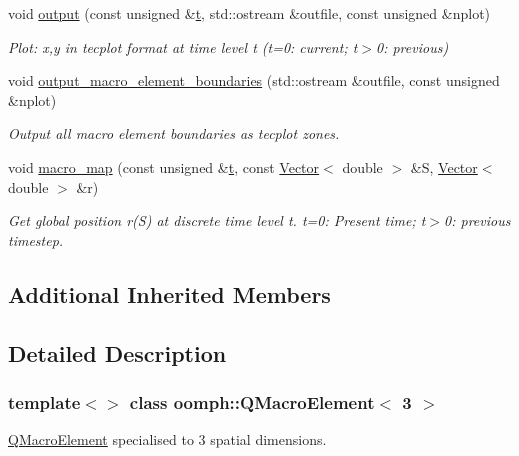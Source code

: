 \begin{DoxyCompactItemize}
void \hyperlink{classoomph_1_1QMacroElement_3_013_01_4_a5c1916d58b2d3142b5fa85f209e16b4c}{output} (const unsigned \&\hyperlink{cfortran_8h_af6f0bd3dc13317f895c91323c25c2b8f}{t}, std\+::ostream \&outfile, const unsigned \&nplot)
\begin{DoxyCompactList}\small\item\em Plot\+: x,y in tecplot format at time level t (t=0\+: current; t$>$0\+: previous) \end{DoxyCompactList}\item 
void \hyperlink{classoomph_1_1QMacroElement_3_013_01_4_aeb5d117bf346d710bd4f8fc4f04dbfd5}{output\+\_\+macro\+\_\+element\+\_\+boundaries} (std\+::ostream \&outfile, const unsigned \&nplot)
\begin{DoxyCompactList}\small\item\em Output all macro element boundaries as tecplot zones. \end{DoxyCompactList}\item 
void \hyperlink{classoomph_1_1QMacroElement_3_013_01_4_ae99513e135616e45927307ccfa0f8306}{macro\+\_\+map} (const unsigned \&\hyperlink{cfortran_8h_af6f0bd3dc13317f895c91323c25c2b8f}{t}, const \hyperlink{classoomph_1_1Vector}{Vector}$<$ double $>$ \&S, \hyperlink{classoomph_1_1Vector}{Vector}$<$ double $>$ \&r)
\begin{DoxyCompactList}\small\item\em Get global position r(\+S) at discrete time level t. t=0\+: Present time; t$>$0\+: previous timestep. \end{DoxyCompactList}\end{DoxyCompactItemize}
\subsection*{Additional Inherited Members}


\subsection{Detailed Description}
\subsubsection*{template$<$$>$\newline
class oomph\+::\+Q\+Macro\+Element$<$ 3 $>$}

\hyperlink{classoomph_1_1QMacroElement}{Q\+Macro\+Element} specialised to 3 spatial dimensions.

